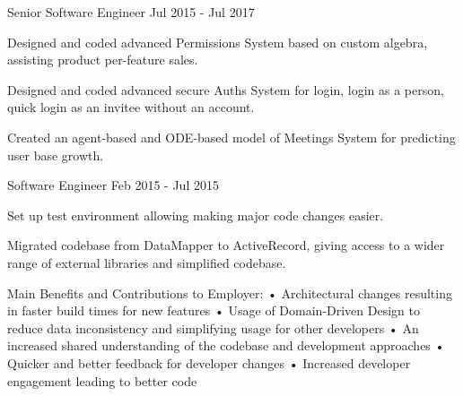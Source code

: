\begin{cventries}
    \cventry
    {Senior Software Engineer} %
    {} %
    {} %
    {Jul 2015 - Jul 2017} %
    {
      \begin{cvitems} %
        \item {Designed and coded advanced Permissions System based on custom algebra, assisting product per-feature sales.}
        \item {Designed and coded advanced secure Auths System for login, login as a person, quick login as an invitee without an account.}
        \item {Created an agent-based and ODE-based model of Meetings System for predicting user base growth.}
      \end{cvitems}
    }

    \cventry
    {Software Engineer} %
    {} %
    {} %
    {Feb 2015 - Jul 2015} %
    {
      \begin{cvitems} %
        \item {Set up test environment allowing making major code changes easier.}
        \item {Migrated codebase from DataMapper to ActiveRecord, giving access to a wider range of external libraries and simplified codebase.}
      \end{cvitems}
    }

\end{cventries}


Main Benefits and Contributions to Employer:
• Architectural changes resulting in faster build times for new features
• Usage of Domain-Driven Design to reduce data inconsistency and simplifying usage for other developers
• An increased shared understanding of the codebase and development approaches
• Quicker and better feedback for developer changes
• Increased developer engagement leading to better code
